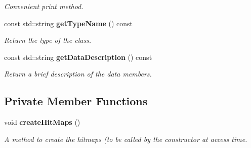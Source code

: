 \begin{DoxyCompactItemize}
\begin{DoxyCompactList}\small\item\em Convenient print method. \end{DoxyCompactList}\item 
const std\-::string {\bf get\-Type\-Name} () const \label{classCALICE_1_1HodoscopeEventDataBlock_a94f5e904602e4d9a4256c232a9e18068}

\begin{DoxyCompactList}\small\item\em Return the type of the class. \end{DoxyCompactList}\item 
const std\-::string {\bf get\-Data\-Description} () const \label{classCALICE_1_1HodoscopeEventDataBlock_a736f44f539d1f896242cbc3682e32a79}

\begin{DoxyCompactList}\small\item\em Return a brief description of the data members. \end{DoxyCompactList}\end{DoxyCompactItemize}
\subsection*{Private Member Functions}
\begin{DoxyCompactItemize}
\item 
void {\bf create\-Hit\-Maps} ()\label{classCALICE_1_1HodoscopeEventDataBlock_aa2133e011daaf804ee14b31f53084b69}

\begin{DoxyCompactList}\small\item\em A method to create the hitmaps (to be called by the constructor at access time. \end{DoxyCompactList}\end{DoxyCompactItemize}
